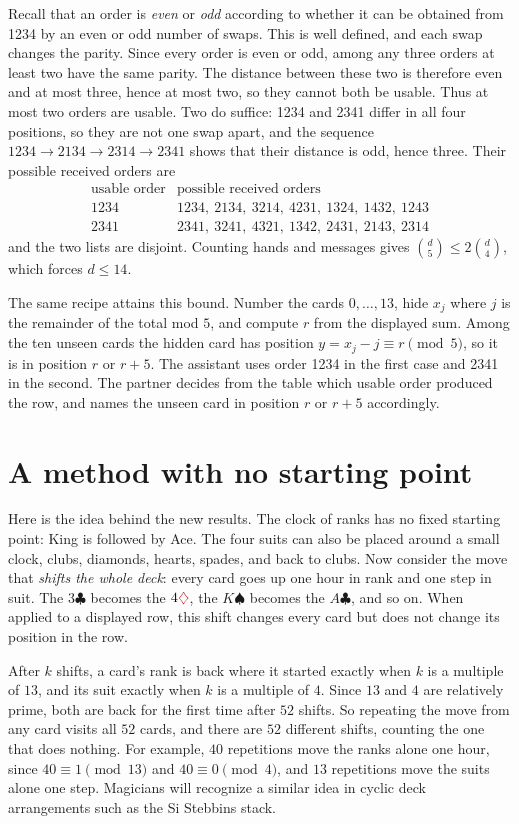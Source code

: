 \documentclass[11pt]{article}
\newcommand{\cl}{\ensuremath{\clubsuit}}
\newcommand{\di}{\textcolor{red!80!black}{\ensuremath{\diamondsuit}}}
\newcommand{\spd}{\ensuremath{\spadesuit}}
\begin{document}
Recall that an order is \emph{even} or \emph{odd} according to whether
it can be obtained from 1234 by an even or odd number of swaps. This
is well defined, and each swap changes the parity.
Since every order is even or odd, among any three orders at least two have the same parity. The distance between these two
is therefore even and
at most three, hence at most two, so they cannot both be usable. Thus
at most two orders are usable. Two do suffice: 1234 and 2341 differ in
all four positions, so they are not one swap apart, and the sequence
$1234\to2134\to2314\to2341$ shows that their distance is odd, hence
three. Their possible received orders are 
$$
\begin{array}{c|l}
\text{usable order} & \text{possible received orders}\\
\hline
1234 & 1234,\ 2134,\ 3214,\ 4231,\ 1324,\ 1432,\ 1243\\
2341 & 2341,\ 3241,\ 4321,\ 1342,\ 2431,\ 2143,\ 2314
\end{array}
$$
and the two lists are disjoint. Counting hands and messages gives $\binom d5\leq2\binom d4$, which forces $d\leq14$.

The same recipe attains this bound. Number the cards $0,\ldots,13$, hide $x_j$ where $j$ is the remainder of the total mod $5$, and compute $r$ from the displayed sum. Among the ten unseen cards the hidden card has position $y=x_j-j\equiv r\pmod5$, so it is in position $r$ or $r+5$. The assistant uses order 1234 in the first case and 2341 in the second. The partner decides from the table which usable order produced the row, and names the unseen card in position $r$ or $r+5$ accordingly.

\section{A method with no starting point}
\label{sec:nostart}

Here is the idea behind the new results. The clock of ranks has no fixed starting point: King is followed by Ace. The four suits can also be placed around a small clock, clubs, diamonds, hearts, spades, and back to clubs. Now consider the move that \emph{shifts the whole deck}: every card goes up one hour in rank and one step in suit. The $3\cl$ becomes the $4\di$, the $K\spd$ becomes the $A\cl$, and so on. 
When applied to a displayed row, this shift changes every card but does not change its position in the row.

After $k$ shifts, a card's rank is back where it started exactly when $k$ is a multiple of $13$, and its suit exactly when $k$ is a multiple of $4$. Since $13$ and $4$ are relatively prime, both are back for the first time after $52$ shifts. So repeating the move from any card visits all $52$ cards, and there are $52$ different shifts, counting the one that does nothing. For example, $40$ repetitions move the ranks alone one hour, since $40\equiv1\pmod{13}$ and $40\equiv0\pmod4$, and $13$ repetitions move the suits alone one step.
Magicians will recognize a similar idea in cyclic deck arrangements such as the Si Stebbins stack.
\end{document}
